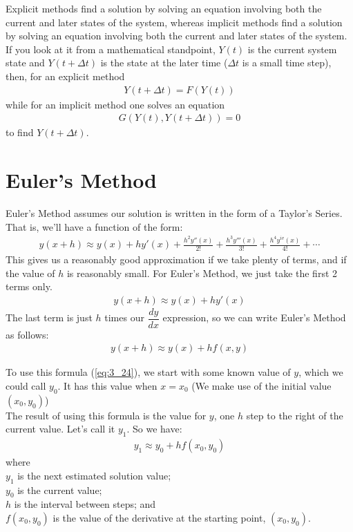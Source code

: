 \documentclass[11pt]{report}
\newcommand{\sps}{\\[0.2cm]}
\newcommand{\refn}[1]{(\ref{#1})}
\newcommand{\refx}[1]{\refn{eq:#1}}
\newcommand{\NI}{\noindent}
\begin{document}
	\NI Explicit methods find a solution by solving an equation involving both the current and later states of the system, whereas implicit methods find a solution by solving an equation involving both the current and later states of the system. If you look at it from a mathematical standpoint, $Y(t)$  is the current system state and $Y(t+\Delta t)$ is the state at the later time ($\Delta t$ is a small time step), then, for an explicit method
	\begin{eqnarray}
		Y(t+\Delta t) =F(Y(t))
	\end{eqnarray}
	while for an implicit method one solves an equation
	\begin{eqnarray}
		G(Y(t),Y(t+ \Delta t) ) =0
	\end{eqnarray}
	to find $Y(t+ \Delta t)$.
	
	
	\section{Euler's Method}
	Euler's Method assumes our solution is written in the form of a Taylor's Series. That is, we'll have a function of the form:
	\begin{eqnarray}
		y(x+h) \approx y(x) + hy'(x) + \frac{h^2 y''(x)}{2!} + \frac{h^3 y'''(x)}{3!} + \frac{h^4 y^{iv}(x)}{4!} + \cdots
	\end{eqnarray}
	This gives us a reasonably good approximation if we take plenty of terms, and if the value of $h$ is reasonably small. For Euler's Method, we just take the first 2 terms only.
	\begin{eqnarray}
			y(x+h) \approx y(x) + hy'(x)
	\end{eqnarray}
	The last term is just $h$ times our $\dfrac{dy}{dx}$ expression, so we can write Euler's Method as follows:
	\begin{eqnarray}
		y(x+h) \approx y(x) + hf(x,y)\label{eq:3_24}
	\end{eqnarray}
	
	\NI To use this formula \refx{3_24}, we start with some known value of $y$, which we could call $y_0$. It has this value when $x=x_0$ (We make use of the initial value $(x_0,y_0)$)\sps
	The result of using this formula is the value for $y$, one $h$ step to the right of the current value. Let's call it $y_1$. So we have:
	\begin{eqnarray*}
		y_1 \approx y_0 + hf(x_0,y_0)
	\end{eqnarray*}
	where\\
	$y_1$ is the next estimated solution value;\\
	$y_0$ is the current value;\\
	$h$ is the interval between steps; and \\
	$f(x_0,y_0)$ is the value of the derivative at the starting point, $(x_0,y_0)$.
	
\end{document}
